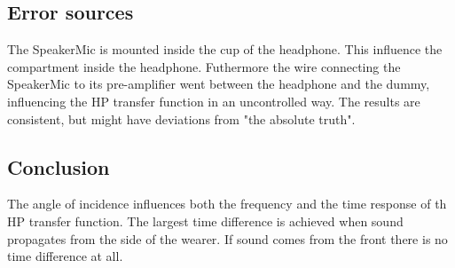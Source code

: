 \subsection{Error sources}
The SpeakerMic is mounted inside the cup of the headphone. This influence the compartment inside the headphone. Futhermore the wire connecting the SpeakerMic to its pre-amplifier went between the headphone and the dummy, influencing the HP transfer function in an uncontrolled way. The results are consistent, but might have deviations from "the absolute truth".

\subsection{Conclusion}
The angle of incidence influences both the frequency and the time response of th HP transfer function.  The largest time difference is achieved when sound propagates from the side of the wearer. If sound comes from the front there is no time difference at all. 